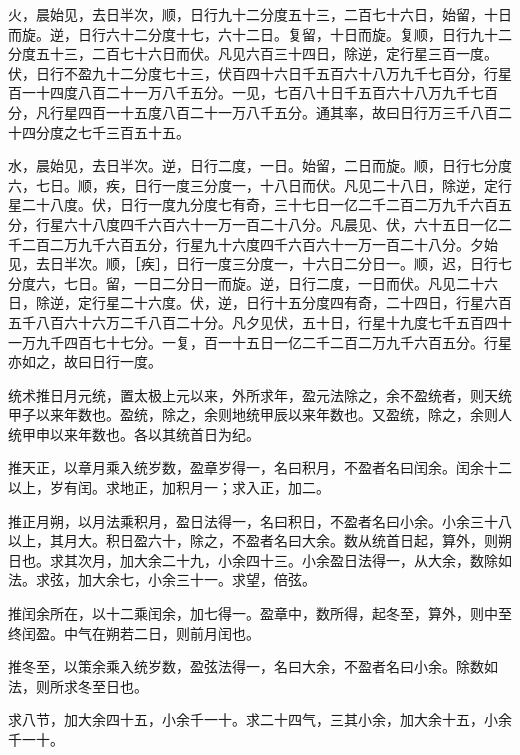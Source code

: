 \documentclass[12pt,UTF8]{ctexbook}
\begin{document}
火，晨始见，去日半次，顺，日行九十二分度五十三，二百七十六日，始留，十日而旋。逆，日行六十二分度十七，六十二日。复留，十日而旋。复顺，日行九十二分度五十三，二百七十六日而伏。凡见六百三十四日，除逆，定行星三百一度。伏，日行不盈九十二分度七十三，伏百四十六日千五百六十八万九千七百分，行星百一十四度八百二十一万八千五分。一见，七百八十日千五百六十八万九千七百分，凡行星四百一十五度八百二十一万八千五分。通其率，故曰日行万三千八百二十四分度之七千三百五十五。



水，晨始见，去日半次。逆，日行二度，一日。始留，二日而旋。顺，日行七分度六，七日。顺，疾，日行一度三分度一，十八日而伏。凡见二十八日，除逆，定行星二十八度。伏，日行一度九分度七有奇，三十七日一亿二千二百二万九千六百五分，行星六十八度四千六百六十一万一百二十八分。凡晨见、伏，六十五日一亿二千二百二万九千六百五分，行星九十六度四千六百六十一万一百二十八分。夕始见，去日半次。顺，［疾］，日行一度三分度一，十六日二分日一。顺，迟，日行七分度六，七日。留，一日二分日一而旋。逆，日行二度，一日而伏。凡见二十六日，除逆，定行星二十六度。伏，逆，日行十五分度四有奇，二十四日，行星六百五千八百六十六万二千八百二十分。凡夕见伏，五十日，行星十九度七千五百四十一万九千四百七十七分。一复，百一十五日一亿二千二百二万九千六百五分。行星亦如之，故曰日行一度。



统术推日月元统，置太极上元以来，外所求年，盈元法除之，余不盈统者，则天统甲子以来年数也。盈统，除之，余则地统甲辰以来年数也。又盈统，除之，余则人统甲申以来年数也。各以其统首日为纪。



推天正，以章月乘入统岁数，盈章岁得一，名曰积月，不盈者名曰闰余。闰余十二以上，岁有闰。求地正，加积月一；求入正，加二。



推正月朔，以月法乘积月，盈日法得一，名曰积日，不盈者名曰小余。小余三十八以上，其月大。积日盈六十，除之，不盈者名曰大余。数从统首日起，算外，则朔日也。求其次月，加大余二十九，小余四十三。小余盈日法得一，从大余，数除如法。求弦，加大余七，小余三十一。求望，倍弦。



推闰余所在，以十二乘闰余，加七得一。盈章中，数所得，起冬至，算外，则中至终闰盈。中气在朔若二日，则前月闰也。



推冬至，以策余乘入统岁数，盈弦法得一，名曰大余，不盈者名曰小余。除数如法，则所求冬至日也。



求八节，加大余四十五，小余千一十。求二十四气，三其小余，加大余十五，小余千一十。
\end{document}

